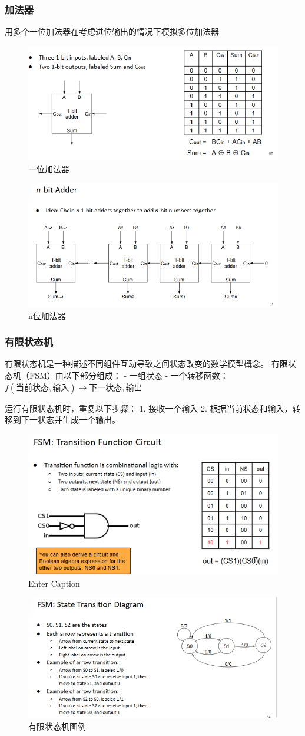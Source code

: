 \documentclass{ctexart}
\begin{document}
\subsubsection{加法器}
用多个一位加法器在考虑进位输出的情况下模拟多位加法器
\begin{figure}
    \centering
    \includegraphics[width=0.5\linewidth]{一位加法器.png}
    \caption{一位加法器}
    \label{fig:enter-label}
\end{figure}
\begin{figure}
    \centering
    \includegraphics[width=0.5\linewidth]{n位加法器.png}
    \caption{n位加法器}
    \label{fig:enter-label}
\end{figure}
\subsubsection{有限状态机}
有限状态机是一种描述不同组件互动导致之间状态改变的数学模型概念。
有限状态机（FSM）由以下部分组成：  
- 一组状态  
- 一个转移函数：\( f(\text{当前状态}, \text{输入}) \rightarrow \text{下一状态}, \text{输出} \)  

运行有限状态机时，重复以下步骤：  
1. 接收一个输入  
2. 根据当前状态和输入，转移到下一状态并生成一个输出。
\begin{figure}
    \centering
    \includegraphics[width=0.5\linewidth]{图例.png}
    \caption{Enter Caption}
    \label{fig:enter-label}
\end{figure}
\begin{figure}
    \centering
    \includegraphics[width=0.5\linewidth]{有限状态机图例.png}
    \caption{有限状态机图例}
    \label{fig:enter-label}
\end{figure}
\end{document}
